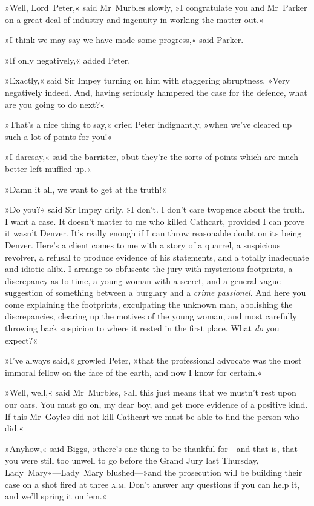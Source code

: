 »Well, Lord~Peter,« said Mr~Murbles slowly, »I congratulate you and Mr~Parker on a great deal of industry and ingenuity in working the matter out.«

»I think we may say we have made some progress,« said Parker.

»If only negatively,« added Peter.

»Exactly,« said Sir Impey turning on him with staggering abruptness.  »Very negatively indeed. And, having seriously hampered the case for the defence, what are you going to do next?«

»That's a nice thing to say,« cried Peter indignantly, »when we've cleared up such a lot of points for you!«

»I daresay,« said the barrister, »but they're the sorts of points which are much better left muffled up.«

»Damn it all, we want to get at the truth!«

»Do you?« said Sir Impey drily. »I don't. I don't care twopence about the truth. I want a case. It doesn't matter to me who killed Cathcart, provided I can prove it wasn't Denver. It's really enough if I can throw reasonable doubt on its being Denver. Here's a client comes to me with a story of a quarrel, a suspicious revolver, a refusal to produce evidence of his statements, and a totally inadequate and idiotic alibi. I arrange to obfuscate the jury with mysterious footprints, a discrepancy as to time, a young woman with a secret, and a general vague suggestion of something between a burglary and a \textit{crime passionel}. And here you come explaining the footprints, exculpating the unknown man, abolishing the discrepancies, clearing up the motives of the young woman, and most carefully throwing back suspicion to where it rested in the first place. What \textit{do} you expect?«

»I've always said,« growled Peter, »that the professional advocate was the most immoral fellow on the face of the earth, and now I know for certain.«

»Well, well,« said Mr~Murbles, »all this just means that we mustn't rest upon our oars. You must go on, my dear boy, and get more evidence of a positive kind. If this Mr~Goyles did not kill Cathcart we must be able to find the person who did.«

»Anyhow,« said Biggs, »there's one thing to be thankful for—and that is, that you were still too unwell to go before the Grand Jury last Thursday, Lady~Mary«—Lady~Mary blushed—»and the prosecution will be building their case on a shot fired at three \textsc{a.m.} Don't answer any questions if you can help it, and we'll spring it on 'em.«

